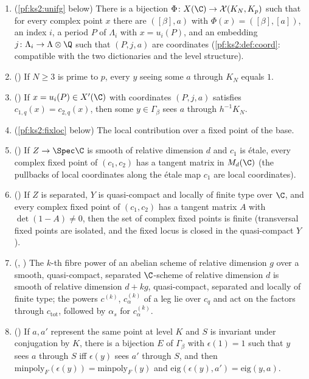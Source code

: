 \begin{enumerate}[label=(U\arabic*)]
  of $\C^g$.
\item\label{pf:ks2:U:unifg} (\cref{pf:ks2:unifg} below) There is a bijection
  $\Phi\colon X(\C)\to\mathcal{X}(K_N,\kstwoKp)$ such that for every complex point $x$ there are
  $([\beta],a)$ with $\Phi(x)=([\beta],[a])$, an index $i$, a period $P$ of $\Lambda_i$ with $x=u_i(P)$,
  and an embedding $j\colon\Lambda_i\to\Lambda\otimes\Q$ such that $(P,j,a)$ are coordinates
  (\cref{pf:ks2:def:coord}: compatible with the two dictionaries and the level structure).
\item\label{pf:ks2:U:stab} () If $N\ge3$ is prime to $p$,
  every $y$ seeing some $a$ through $K_N$ equals $1$.
\item\label{pf:ks2:U:fwd} () If $x=u_i(P)\in X'(\C)$ with
  coordinates $(P,j,a)$ satisfies $c_{1,q}(x)=c_{2,q}(x)$, then some $y\in\Gamma_\beta$ sees $a$ through
  $h^{-1}K_N$.
\item\label{pf:ks2:U:loc} (\cref{pf:ks2:fixloc} below) The local contribution over a fixed point of the
  base.
\item\label{pf:ks2:U:tan} () If $Z\to\Spec\C$ is smooth of
  relative dimension $d$ and $c_1$ is \'etale, every complex fixed point of $(c_1,c_2)$ has a tangent
  matrix in $M_d(\C)$ (the pullbacks of local coordinates along the \'etale map $c_1$ are local
  coordinates).
\item\label{pf:ks2:U:fin} () If $Z$ is separated, $Y$ is
  quasi-compact and locally of finite type over $\C$, and every complex fixed point of $(c_1,c_2)$ has a
  tangent matrix $A$ with $\det(1-A)\ne0$, then the set of complex fixed points is finite (transversal
  fixed points are isolated, and the fixed locus is closed in the quasi-compact $Y$).
\item\label{pf:ks2:U:pow} (, )
  The $k$-th fibre power of an abelian scheme of relative dimension $g$ over a smooth, quasi-compact,
  separated $\C$-scheme of relative dimension $d$ is smooth of relative dimension $d+kg$, quasi-compact,
  separated and locally of finite type; the powers $c^{(k)}$, $c^{(k)}_\alpha$ of a leg lie over $c_q$ and
  act on the factors through $c_{\mathrm{tot}}$, followed by $\alpha_s$ for $c^{(k)}_\alpha$.
\item\label{pf:ks2:U:eig} () If $a,a'$ represent the same
  point at level $K$ and $S$ is invariant under conjugation by $K$, there is a bijection $E$ of
  $\Gamma_\beta$ with $\epsilon(1)=1$ such that $y$ sees $a$ through $S$ iff $\epsilon(y)$ sees $a'$ through $S$, and then
  $\mathrm{minpoly}_F(\epsilon(y))=\mathrm{minpoly}_F(y)$ and $\mathrm{eig}(\epsilon(y),a')=\mathrm{eig}(y,a)$.
\end{enumerate}

